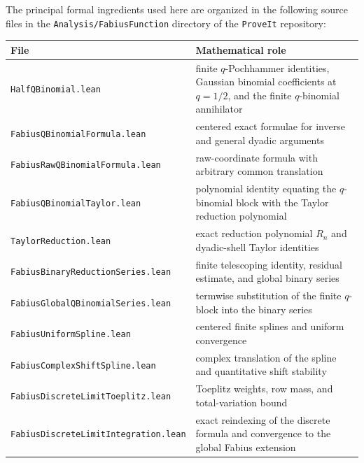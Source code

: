 \documentclass[11pt,oneside]{article}
\theoremstyle{definition}
\theoremstyle{remark}
\begin{document}
The principal formal ingredients used here are organized in the following
source files in the \texttt{Analysis/FabiusFunction} directory of the
\texttt{ProveIt} repository:

\begin{center}
\renewcommand{\arraystretch}{1.16}
\begin{tabularx}{0.96\textwidth}{>{\raggedright\arraybackslash}p{}X}
\toprule
\normalfont File & Mathematical role\\
\midrule
\nolinkurl{HalfQBinomial.lean}
 & finite $q$-Pochhammer identities, Gaussian binomial coefficients at
   $q=1/2$, and the finite $q$-binomial annihilator\\
\nolinkurl{FabiusQBinomialFormula.lean}
 & centered exact formulae for inverse and general dyadic arguments\\
\nolinkurl{FabiusRawQBinomialFormula.lean}
 & raw-coordinate formula with arbitrary common translation\\
\nolinkurl{FabiusQBinomialTaylor.lean}
 & polynomial identity equating the $q$-binomial block with the Taylor
   reduction polynomial\\
\nolinkurl{TaylorReduction.lean}
 & exact reduction polynomial $R_n$ and dyadic-shell Taylor identities\\
\nolinkurl{FabiusBinaryReductionSeries.lean}
 & finite telescoping identity, residual estimate, and global binary series\\
\nolinkurl{FabiusGlobalQBinomialSeries.lean}
 & termwise substitution of the finite $q$-block into the binary series\\
\nolinkurl{FabiusUniformSpline.lean}
 & centered finite splines and uniform convergence\\
\nolinkurl{FabiusComplexShiftSpline.lean}
 & complex translation of the spline and quantitative shift stability\\
\nolinkurl{FabiusDiscreteLimitToeplitz.lean}
 & Toeplitz weights, row mass, and total-variation bound\\
\nolinkurl{FabiusDiscreteLimitIntegration.lean}
 & exact reindexing of the discrete formula and convergence to the global
   Fabius extension\\
\bottomrule
\end{tabularx}
\end{center}
\end{document}
